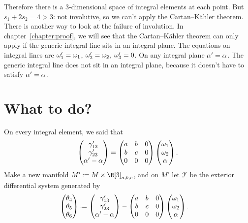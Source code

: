 Therefore there is a \(3\)-dimensional space of integral elements at each point.
But \(s_1+2s_2=4>3\): not involutive, so we can't apply the Cartan--K\"ahler theorem.
There is another way to look at the failure of involution.
In chapter~\ref{chapter:proof}, we will see that the Cartan--K\"ahler theorem can only apply if the generic integral line sits in an integral plane.
The equations on integral lines are \(\omega'_1=\omega_1\), \(\omega'_2=\omega_2\), \(\omega'_3=0\).
On any integral plane \(\alpha'=\alpha\).
The generic integral line does not sit in an integral plane, because it doesn't have to satisfy \(\alpha'=\alpha\).

\section{What to do?}
On every integral element, we said that
\[
\begin{pmatrix} 
\gamma'_{13} \\
\gamma'_{23} \\
\alpha'-\alpha
\end{pmatrix}
=
\begin{pmatrix}
a & b & 0\\
b & c & 0\\
0 & 0 & 0
\end{pmatrix} 
\begin{pmatrix}
\omega_1 \\
\omega_2 \\
\alpha
\end{pmatrix}.
\]
Make a new manifold \(M' \defeq M \times \R[3]_{a,b,c}\), and on \(M'\) let \(\mathcal{I}'\) be the exterior differential system generated by
\begin{align*}
\begin{pmatrix}
\theta_4 \\
\theta_5 \\
\theta_6 
\end{pmatrix}
&\defeq 
\begin{pmatrix}
\qc_{13} \\
\qc_{23} \\
\otalpha-\alpha
\end{pmatrix}
-
\begin{pmatrix}
a & b & 0 \\
b & c & 0 \\
0 & 0 & 0
\end{pmatrix}
\begin{pmatrix}
\pf_1 \\
\pf_2 \\
\alpha
\end{pmatrix}.
\end{align*}



